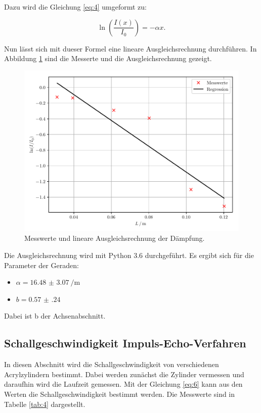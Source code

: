 Dazu wird die Gleichung \ref{eq:4} umgeformt zu:

\begin{equation*}
 \ln \left(\frac{I(x)}{I_0}\right) = - \alpha x.
\end{equation*}

Nun lässt sich mit dueser Formel eine lineare Ausgleichsrechnung durchführen.
In Abbildung \ref{abb:2} sind die Messerte und die Ausgleichsrechnung gezeigt.

\begin{figure}[H]
  \centering
  \includegraphics[width=\textwidth]{plot1.pdf}
  \caption{Messwerte und lineare Ausgleichsrechnung der Dämpfung.}
  \label{abb:2}
\end{figure}

Die Ausgleichsrechnung wird mit Python 3.6 durchgeführt. Es ergibt sich für die Parameter
der Geraden:

\begin{itemize}
  \item $\alpha = \SI{16.48(307)}{\per\meter}$
  \item $b = \num{0.57(24)}$
\end{itemize}

Dabei ist b der Achsenabschnitt.

\subsection{Schallgeschwindigkeit Impuls-Echo-Verfahren}

In diesen Abschnitt wird die Schallgeschwindigkeit von verschiedenen Acrylzylindern
bestimmt. Dabei werden zunächst die Zylinder vermessen und daraufhin wird die Laufzeit
gemessen. Mit der Gleichung \ref{eq:6} kann aus den Werten die Schallgeschwindigkeit
bestimmt werden. Die Messwerte sind in Tabelle \ref{tab:4} dargestellt.

